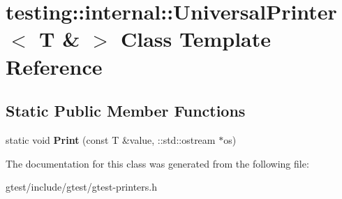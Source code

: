 \hypertarget{classtesting_1_1internal_1_1UniversalPrinter_3_01T_01_6_01_4}{}\section{testing\+:\+:internal\+:\+:Universal\+Printer$<$ T \& $>$ Class Template Reference}
\label{classtesting_1_1internal_1_1UniversalPrinter_3_01T_01_6_01_4}
\subsection*{Static Public Member Functions}
\begin{DoxyCompactItemize}
\item 
\mbox{\label{classtesting_1_1internal_1_1UniversalPrinter_3_01T_01_6_01_4_a923a694be8aa66117848c1c5f57ede35}} 
static void {\bfseries Print} (const T \&value, \+::std\+::ostream $\ast$os)
\end{DoxyCompactItemize}


The documentation for this class was generated from the following file\+:\begin{DoxyCompactItemize}
\item 
gtest/include/gtest/gtest-\/printers.\+h\end{DoxyCompactItemize}
